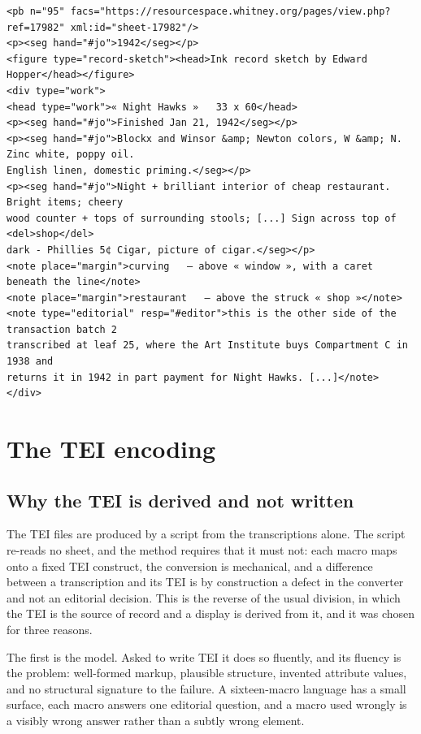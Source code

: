 \documentclass[11pt]{article}
\begin{document}
\begin{lstlisting}
<pb n="95" facs="https://resourcespace.whitney.org/pages/view.php?ref=17982" xml:id="sheet-17982"/>
<p><seg hand="#jo">1942</seg></p>
<figure type="record-sketch"><head>Ink record sketch by Edward Hopper</head></figure>
<div type="work">
<head type="work">« Night Hawks »   33 x 60</head>
<p><seg hand="#jo">Finished Jan 21, 1942</seg></p>
<p><seg hand="#jo">Blockx and Winsor &amp; Newton colors, W &amp; N. Zinc white, poppy oil.
English linen, domestic priming.</seg></p>
<p><seg hand="#jo">Night + brilliant interior of cheap restaurant. Bright items; cheery
wood counter + tops of surrounding stools; [...] Sign across top of <del>shop</del>
dark - Phillies 5¢ Cigar, picture of cigar.</seg></p>
<note place="margin">curving   — above « window », with a caret beneath the line</note>
<note place="margin">restaurant   — above the struck « shop »</note>
<note type="editorial" resp="#editor">this is the other side of the transaction batch 2
transcribed at leaf 25, where the Art Institute buys Compartment C in 1938 and
returns it in 1942 in part payment for Night Hawks. [...]</note>
</div>
\end{lstlisting}

\section{The TEI encoding}

\subsection{Why the TEI is derived and not written}

The TEI files are produced by a script from the transcriptions alone. The script re-reads no sheet, and the method requires that it must not: each macro maps onto a fixed TEI construct, the conversion is mechanical, and a difference between a transcription and its TEI is by construction a defect in the converter and not an editorial decision. This is the reverse of the usual division, in which the TEI is the source of record and a display is derived from it, and it was chosen for three reasons.

The first is the model. Asked to write TEI it does so fluently, and its fluency is the problem: well-formed markup, plausible structure, invented attribute values, and no structural signature to the failure. A sixteen-macro language has a small surface, each macro answers one editorial question, and a macro used wrongly is a visibly wrong answer rather than a subtly wrong element.
\end{document}
